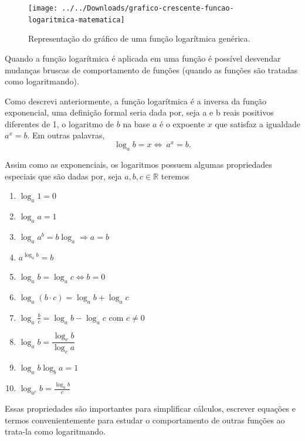 \documentclass[10pt,a4paper]{article}
\begin{document}
	\begin{figure}[h!]
		\centering
		\texttt{[image: ../../Downloads/grafico-crescente-funcao-logaritmica-matematica]}
		\caption{Representação do gráfico de uma função logarítmica genérica.}
		\label{fig:grafico-crescente-funcao-logaritmica-matematica}
	\end{figure}
	Quando a função logarítmica é aplicada em uma função é possível desvendar mudanças bruscas de comportamento de funções (quando as funções são tratadas como logaritmando).
	\newpage
	
	Como descrevi anteriormente, a função logarítmica é a inversa da função exponencial, uma definição formal seria dada por, seja a e b reais positivos diferentes de 1, o logaritmo de $ b $ na base $ a $ é o expoente $ x $ que satisfaz a igualdade $ a^x = b $. Em outras palavras,
	\begin{equation}
      \log_a b = x	\Leftrightarrow\ a^x = b.	\nonumber
	\end{equation}
	
	Assim como as exponenciais, os logaritmos possuem algumas propriedades especiais que são dadas por, seja $ a,b,c \in \mathbb{R}$ teremos
	\begin{enumerate}
		\item $\log_a 1 = 0$ \label{log1}
		
		\item $ \log_a a = 1 $ \label{log2}
		
		\item $ \log_a a^b = b \log_a \Rightarrow a = b $ \label{log3}
		
		\item $ a^{\log_a b} = b $ \label{log4}
		
		\item $\log_a b = \log_a c \Leftrightarrow b =0$ \label{log5}
		
		\item $ \log_a (b\cdot c) = \log_a b + \log_a c$ \label{log6}
		
		\item $  \log_a \frac{b}{c} = \log_a b - \log_a c $ com $ c \neq 0 $ \label{log7}
		
		\item $ \log_a b = \dfrac{\log_c b}{\log_c a} $ \label{log8}
		
		\item  $ \log_a b \log_b a = 1  $ \label{log9}
		
		\item $ \log_{a^c} b = \frac{\log_a b}{c} $ \label{log10}
	\end{enumerate}
		Essas propriedades são importantes para simplificar cálculos, escrever equações e termos convenientemente para estudar o comportamento de outras funções ao trata-la como logaritmando.
		
\end{document}
